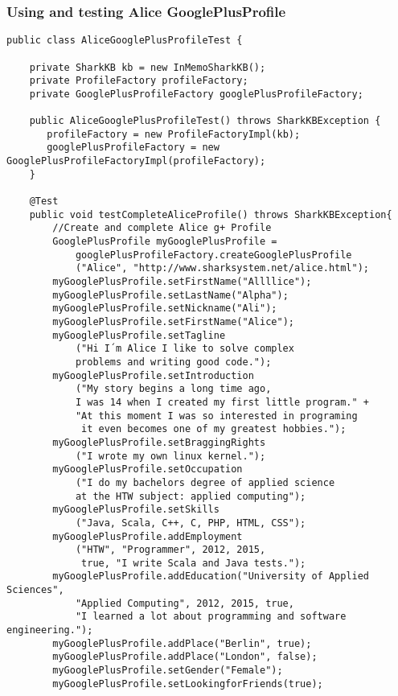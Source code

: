 \documentclass[12pt]{article}
\begin{document}
\subsubsection{Using and testing Alice GooglePlusProfile}

\begin{verbatim}
public class AliceGooglePlusProfileTest {

    private SharkKB kb = new InMemoSharkKB();
    private ProfileFactory profileFactory;
    private GooglePlusProfileFactory googlePlusProfileFactory;

    public AliceGooglePlusProfileTest() throws SharkKBException {
       profileFactory = new ProfileFactoryImpl(kb);
       googlePlusProfileFactory = new GooglePlusProfileFactoryImpl(profileFactory);
    }

    @Test
    public void testCompleteAliceProfile() throws SharkKBException{
        //Create and complete Alice g+ Profile
        GooglePlusProfile myGooglePlusProfile =
            googlePlusProfileFactory.createGooglePlusProfile
            ("Alice", "http://www.sharksystem.net/alice.html");
        myGooglePlusProfile.setFirstName("Allllice");
        myGooglePlusProfile.setLastName("Alpha");
        myGooglePlusProfile.setNickname("Ali");
        myGooglePlusProfile.setFirstName("Alice");
        myGooglePlusProfile.setTagline
            ("Hi I´m Alice I like to solve complex
            problems and writing good code.");
        myGooglePlusProfile.setIntroduction
            ("My story begins a long time ago,
            I was 14 when I created my first little program." +
            "At this moment I was so interested in programing
             it even becomes one of my greatest hobbies.");
        myGooglePlusProfile.setBraggingRights
            ("I wrote my own linux kernel.");
        myGooglePlusProfile.setOccupation
            ("I do my bachelors degree of applied science
            at the HTW subject: applied computing");
        myGooglePlusProfile.setSkills
            ("Java, Scala, C++, C, PHP, HTML, CSS");
        myGooglePlusProfile.addEmployment
            ("HTW", "Programmer", 2012, 2015,
             true, "I write Scala and Java tests.");
        myGooglePlusProfile.addEducation("University of Applied Sciences",
            "Applied Computing", 2012, 2015, true,
            "I learned a lot about programming and software engineering.");
        myGooglePlusProfile.addPlace("Berlin", true);
        myGooglePlusProfile.addPlace("London", false);
        myGooglePlusProfile.setGender("Female");
        myGooglePlusProfile.setLookingforFriends(true);

\end{verbatim}
\end{document}
